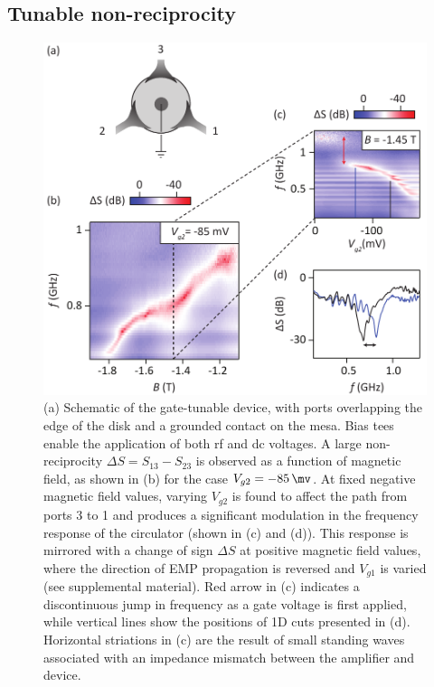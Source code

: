 \subsection{Tunable non-reciprocity}
\begin{figure}
\includegraphics[width=0.75\columnwidth]{fig5_QH}
\caption[Tunable non-reciprocity of the quantum Hall circulator]{\label{FIG. 5.}
(a) Schematic of the gate-tunable device, with ports overlapping the edge of the disk and a grounded contact on the mesa. Bias tees enable the application of both rf and dc voltages.
A large non-reciprocity $\Delta S = S_{13}-S_{23}$ is observed as a function of magnetic field, as shown in (b) for the case $V_{g2} = \SI{-85}{\mv}$.
At fixed negative magnetic field values, varying $V_{g2}$ is found to affect the path from ports 3 to 1 and produces a significant modulation in the frequency response of the circulator (shown in (c) and (d)). This response is mirrored with a change of sign $\Delta S$ at positive magnetic field values, where the direction of EMP propagation is reversed and $V_{g1}$ is varied (see supplemental material).  Red arrow in (c)  indicates a discontinuous jump in frequency as a gate voltage is first applied, while vertical lines show the positions of 1D cuts presented in (d). Horizontal striations in (c) are the result of small standing waves associated with an impedance mismatch between the amplifier and device.}
\end{figure}

